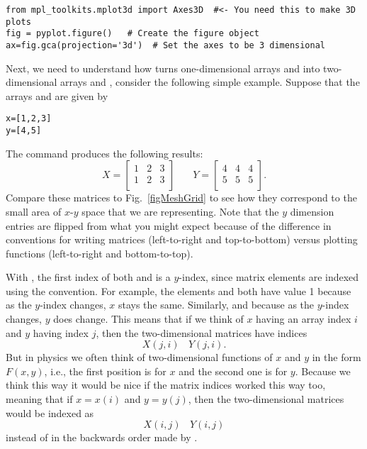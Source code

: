 \begin{Verbatim}
from mpl_toolkits.mplot3d import Axes3D  #<- You need this to make 3D plots
fig = pyplot.figure()   # Create the figure object
ax=fig.gca(projection='3d')  # Set the axes to be 3 dimensional
\end{Verbatim}

Next, we need to understand how  turns one-dimensional arrays
 and  into two-dimensional arrays 
and , consider the following simple example. Suppose that
the arrays  and  are given by
\begin{Verbatim}
x=[1,2,3]
y=[4,5]
\end{Verbatim}
The command  produces the following
results:
\begin{equation}\label{eq:MeshgridMatrices}
X = \left[ \begin{array}{lll}
1 & 2 & 3 \\
1 & 2 & 3 \\
\end{array}
\right]~~~~~~~~ Y = \left[ \begin{array}{lll}
4 & 4 & 4 \\
5 & 5 & 5 \\
\end{array}
\right] .
\end{equation}
Compare these matrices to Fig.~\ref{figMeshGrid} to see how they
correspond to the small area of $x$-$y$ space that we are
representing.  Note that the $y$ dimension entries are flipped from
what you might expect because of the difference in conventions for
writing matrices (left-to-right and top-to-bottom) versus plotting
functions (left-to-right and bottom-to-top).

 With , the first index of both 
and  is a $y$-index, since matrix elements are indexed using the
 convention. For example, the elements  and
 both have value 1 because as the $y$-index changes, $x$ stays the
same. Similarly,  and  because as the
$y$-index changes, $y$ does change. This means that if we think of $x$
having an array index $i$ and $y$ having index $j$, then the two-dimensional
matrices have indices
\begin{equation}
    X(j,i)~~~~Y(j,i)  .
\end{equation}
But in physics we often think of two-dimensional functions of $x$ and $y$ in
the form $F(x,y)$, i.e., the first position is for $x$ and the second one is
for $y$. Because we think this way it would be nice if the matrix indices
worked this way too, meaning that if $x=x(i)$ and $y=y(j)$, then the
two-dimensional matrices would be indexed as
\begin{equation}
X(i,j)~~~~Y(i,j)
\end{equation}
instead of in the backwards order made by .

